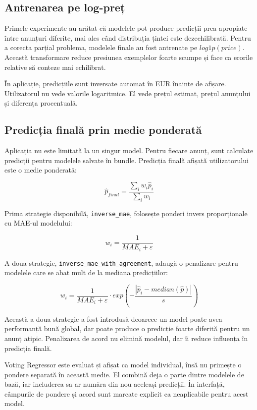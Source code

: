 \subsection{Antrenarea pe log-preț}
\label{sec:models-log-training}

Primele experimente au arătat că modelele pot produce predicții prea apropiate între anunțuri diferite, mai ales când distribuția țintei este dezechilibrată. Pentru a corecta parțial problema, modelele finale au fost antrenate pe \(log1p(price)\). Această transformare reduce presiunea exemplelor foarte scumpe și face ca erorile relative să conteze mai echilibrat.

În aplicație, predicțiile sunt inversate automat în EUR înainte de afișare. Utilizatorul nu vede valorile logaritmice. El vede prețul estimat, prețul anunțului și diferența procentuală.

\subsection{Predicția finală prin medie ponderată}
\label{sec:models-weighted}

Aplicația nu este limitată la un singur model. Pentru fiecare anunț, sunt calculate predicții pentru modelele salvate în bundle. Predicția finală afișată utilizatorului este o medie ponderată:

\[
    \hat{p}_{final} = \frac{\sum_i w_i \hat{p}_i}{\sum_i w_i}
\]

Prima strategie disponibilă, \texttt{inverse\_mae}, folosește ponderi invers proporționale cu MAE-ul modelului:

\[
    w_i = \frac{1}{MAE_i + \varepsilon}
\]

A doua strategie, \texttt{inverse\_mae\_with\_agreement}, adaugă o penalizare pentru modelele care se abat mult de la mediana predicțiilor:

\[
    w_i = \frac{1}{MAE_i + \varepsilon} \cdot exp\left(-\frac{|\hat{p}_i - median(\hat{p})|}{s}\right)
\]

Această a doua strategie a fost introdusă deoarece un model poate avea performanță bună global, dar poate produce o predicție foarte diferită pentru un anunț atipic. Penalizarea de acord nu elimină modelul, dar îi reduce influența în predicția finală.

Voting Regressor este evaluat și afișat ca model individual, însă nu primește o pondere separată în această medie. El combină deja o parte dintre modelele de bază, iar includerea sa ar număra din nou aceleași predicții. În interfață, câmpurile de pondere și acord sunt marcate explicit ca neaplicabile pentru acest model.

